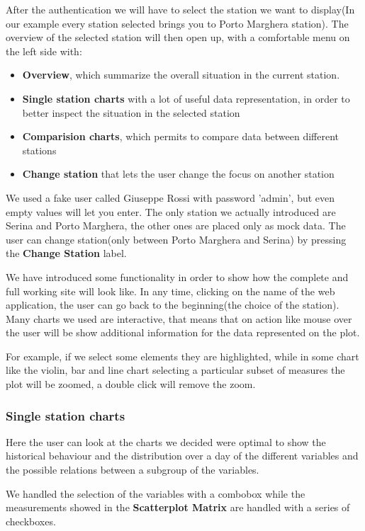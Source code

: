 \documentclass[12pt]{article} %
\begin{document}
After the authentication we will have to select the station we want to display(In our example every station selected brings you to Porto Marghera station).
The overview of the selected station will then open up, with a comfortable menu on the left side with:
\begin{itemize}
	\item \textbf{Overview}, which summarize the overall situation in the current station.
	\item \textbf{Single station charts} with a lot of useful data representation, in order to better inspect the situation in the selected station
	\item \textbf{Comparision charts}, which permits to compare data between different stations
	\item \textbf{Change station} that lets the user change the focus on another station 
\end{itemize}
We used a fake user called Giuseppe Rossi with password 'admin', but even empty values will let you enter.
The only station we actually introduced are Serina and Porto Marghera, the other ones are placed only as mock data.
The user can change station(only between Porto Marghera and Serina) by pressing the \textbf{Change Station} label.

We have introduced some functionality in order to show how the complete and full working site will look like.
In any time, clicking on the name of the web application, the user can go back to the beginning(the choice of the station).
Many charts we used are interactive, that means that on action like mouse over the user will be show additional information for the data represented on the plot.

For example, if we select some elements they are highlighted, while in some chart like the violin, bar and line chart selecting a particular subset of measures the plot will be zoomed, a double click will remove the zoom.

\subsubsection{Single station charts}
Here the user can look at the charts we decided were optimal to show the historical behaviour and the distribution over a day of the different variables and the possible relations between a subgroup of the  variables.

We handled the selection of the variables with a combobox while the measurements showed in the	\textbf{Scatterplot Matrix} are handled with a series of checkboxes.
\end{document}
